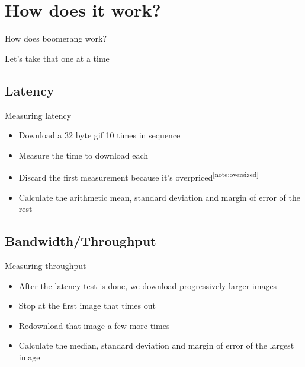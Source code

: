 \documentclass{beamer}
\begin{document}
\section{How does it work?}

\begin{frame}{}
  \begin{center}
  How does boomerang work?
  \end{center}
\end{frame}

\begin{frame}{}
  \begin{center}
  Let's take that one at a time
  \end{center}
\end{frame}

\subsection{Latency}
\begin{frame}{Measuring latency}
  \begin{itemize}
  \item Download a 32 byte gif 10 times in sequence
  \item Measure the time to download each
  \item Discard the first measurement because it's overpriced\textsuperscript{\ref{note:oversized}}
  \item Calculate the arithmetic mean, standard deviation and margin of error of the rest
  \end{itemize}
\end{frame}

\subsection{Bandwidth/Throughput}
\begin{frame}{Measuring throughput}
  \begin{itemize}
  \item After the latency test is done, we download progressively larger images
  \item Stop at the first image that times out
  \item Redownload that image a few more times
  \item Calculate the median, standard deviation and margin of error of the largest image
  \end{itemize}
\end{frame}
\end{document}
